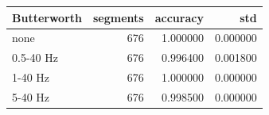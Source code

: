 \begin{tabular}{lrrr}
\toprule
Butterworth & segments & accuracy & std \\
\midrule
none & 676 & 1.000000 & 0.000000 \\
0.5-40 Hz & 676 & 0.996400 & 0.001800 \\
1-40 Hz & 676 & 1.000000 & 0.000000 \\
5-40 Hz & 676 & 0.998500 & 0.000000 \\
\bottomrule
\end{tabular}
